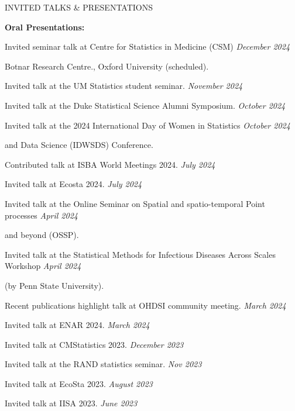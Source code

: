 \documentclass{resume} %
\begin{document}
\begin{rSection}{INVITED TALKS \& PRESENTATIONS}
	
	\hspace{-.2in} {\textbf{Oral Presentations:}}
	
	
	Invited seminar talk at Centre for Statistics in Medicine (CSM)  \hfill {\em December 2024}
	
	\vspace{-0.1in} 
	Botnar Research Centre., Oxford University (scheduled). 
	
	Invited talk at the UM Statistics student seminar.  \hfill {\em November 2024} 
	
	Invited talk at the Duke Statistical Science Alumni Symposium.  \hfill {\em October 2024} 
	
	Invited talk at the 2024 International Day of Women  in Statistics 
	 \hfill {\em October 2024} 
	 
	\vspace{-0.1in} 
	and Data Science (IDWSDS) Conference. 
	
	Contributed talk at ISBA World Meetings 2024.  \hfill {\em July 2024}
	
	Invited talk at Ecosta 2024.  \hfill {\em July 2024}
	
	Invited talk at the Online Seminar on Spatial and spatio-temporal Point processes   \hfill {\em April 2024}
	
	\vspace{-0.1in} 
	and beyond (OSSP).
	
	Invited talk at the Statistical Methods for Infectious Diseases Across Scales Workshop \hfill {\em April 2024}
	
	\vspace{-0.1in}
	(by Penn State University).
	
	Recent publications highlight talk at OHDSI community meeting. \hfill {\em March 2024}
	
	Invited talk at ENAR 2024.  \hfill {\em March 2024}
	
	Invited talk at CMStatistics 2023. \hfill {\em December 2023}
	
	Invited talk at the RAND statistics seminar. \hfill {\em Nov 2023}
	
	Invited talk at EcoSta 2023. \hfill {\em August 2023}
	
	Invited talk at IISA 2023.  \hfill {\em June 2023}
	

\end{rSection}
\end{document}
